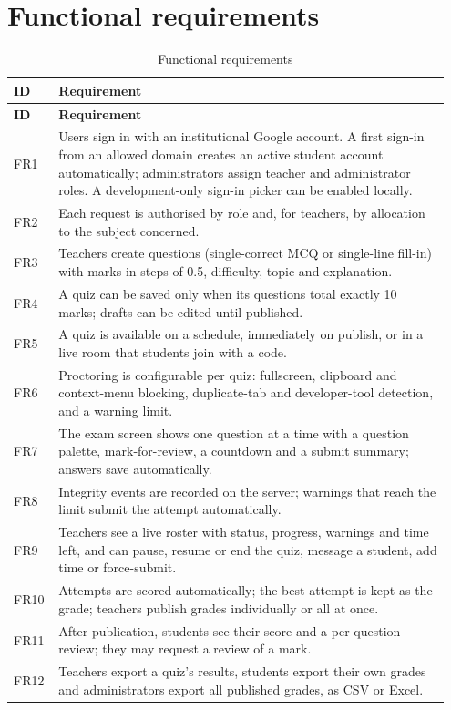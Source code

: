 \documentclass[12pt,a4paper,oneside]{report}
\begin{document}
\section{Functional requirements}
\begin{longtable}{@{}p{0.09\linewidth}p{0.86\linewidth}@{}}
\caption{Functional requirements}\label{tab:fr}\\
\toprule
\textbf{ID} & \textbf{Requirement}\\ \midrule
\endfirsthead
\toprule
\textbf{ID} & \textbf{Requirement}\\ \midrule
\endhead
FR1 & Users sign in with an institutional Google account. A first sign-in from an allowed domain creates an active student account automatically; administrators assign teacher and administrator roles. A development-only sign-in picker can be enabled locally.\\
FR2 & Each request is authorised by role and, for teachers, by allocation to the subject concerned.\\
FR3 & Teachers create questions (single-correct MCQ or single-line fill-in) with marks in steps of 0.5, difficulty, topic and explanation.\\
FR4 & A quiz can be saved only when its questions total exactly 10 marks; drafts can be edited until published.\\
FR5 & A quiz is available on a schedule, immediately on publish, or in a live room that students join with a code.\\
FR6 & Proctoring is configurable per quiz: fullscreen, clipboard and context-menu blocking, duplicate-tab and developer-tool detection, and a warning limit.\\
FR7 & The exam screen shows one question at a time with a question palette, mark-for-review, a countdown and a submit summary; answers save automatically.\\
FR8 & Integrity events are recorded on the server; warnings that reach the limit submit the attempt automatically.\\
FR9 & Teachers see a live roster with status, progress, warnings and time left, and can pause, resume or end the quiz, message a student, add time or force-submit.\\
FR10 & Attempts are scored automatically; the best attempt is kept as the grade; teachers publish grades individually or all at once.\\
FR11 & After publication, students see their score and a per-question review; they may request a review of a mark.\\
FR12 & Teachers export a quiz's results, students export their own grades and administrators export all published grades, as CSV or Excel.\\
\bottomrule
\end{longtable}
\end{document}
